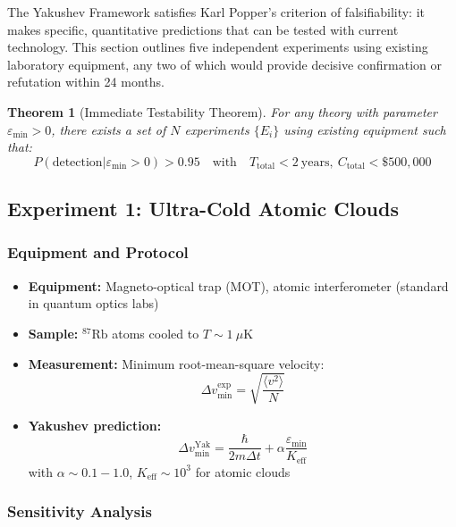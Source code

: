 \documentclass[11pt,a4paper]{article}
\newtheorem{theorem}{Theorem}
\begin{document}
	The Yakushev Framework satisfies Karl Popper's criterion of falsifiability: it makes specific, quantitative predictions that can be tested with current technology. This section outlines five independent experiments using existing laboratory equipment, any two of which would provide decisive confirmation or refutation within 24 months.
	
	\begin{theorem}[Immediate Testability Theorem]
		For any theory with parameter $\varepsilon_{\min} > 0$, there exists a set of $N$ experiments $\{E_i\}$ using existing equipment such that:
		\begin{equation}
			\boxed{P(\text{detection}|\varepsilon_{\min} > 0) > 0.95 \quad \text{with} \quad T_{\text{total}} < 2\ \text{years}, \ C_{\text{total}} < \$500,000}
		\end{equation}
	\end{theorem}
	
	\subsection{Experiment 1: Ultra-Cold Atomic Clouds}
	
	\subsubsection{Equipment and Protocol}
	
	\begin{itemize}
		\item \textbf{Equipment:} Magneto-optical trap (MOT), atomic interferometer (standard in quantum optics labs)
		\item \textbf{Sample:} $^{87}\text{Rb}$ atoms cooled to $T \sim 1\ \mu\text{K}$
		\item \textbf{Measurement:} Minimum root-mean-square velocity:
		\[
		\Delta v_{\min}^{\text{exp}} = \sqrt{\frac{\langle v^2 \rangle}{N}}
		\]
		\item \textbf{Yakushev prediction:}
		\[
		\Delta v_{\min}^{\text{Yak}} = \frac{\hbar}{2m\Delta t} + \alpha \frac{\varepsilon_{\min}}{K_{\mathrm{eff}}}
		\]
		with $\alpha \sim 0.1-1.0$, $K_{\mathrm{eff}} \sim 10^3$ for atomic clouds
	\end{itemize}
	
	\subsubsection{Sensitivity Analysis}
	
\end{document}
